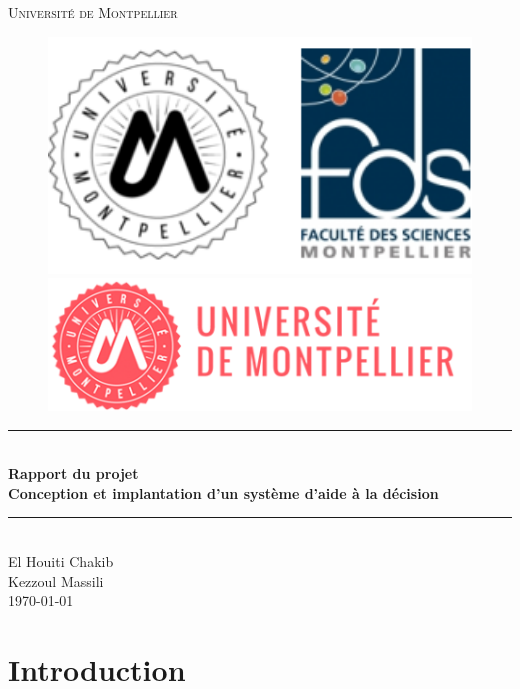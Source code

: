 \documentclass[12pt,titlepage]{article}
\begin{document}
\begin{titlepage}
\newcommand{\HRule}{\rule{\linewidth}{0.5mm}}
\center
\textsc{\LARGE
Université de Montpellier
} \\[1cm]
\begin{figure}[h]
	\begin{minipage}[c]{.46\linewidth}
		\centering
		\includegraphics[width=1\textwidth]{img/fds.png}
	\end{minipage}
	\hfill%
	\begin{minipage}[c]{.46\linewidth}
		\centering
		\includegraphics[width=1\textwidth]{img/univ-montpellier.png}
	\end{minipage}
\end{figure}

\HRule \\[0.4cm]
{ \huge \bfseries Rapport du projet \\Conception et
implantation d’un système d’aide
à la décision }
\HRule \\[1.5cm]
El Houiti Chakib \\
Kezzoul Massili
\\[1cm]
\today \\ [1cm]
\end{titlepage}

\section*{Introduction}
\end{document}
